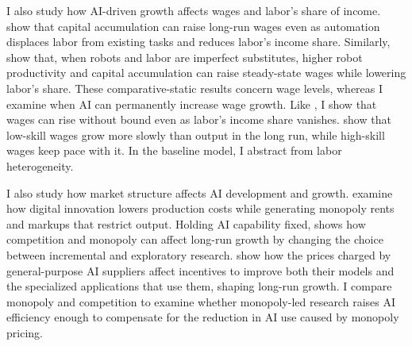 I also study how AI-driven growth affects wages and labor's share of income.
\citet{acemoglurestrepo2018} show that capital accumulation can raise
long-run wages even as automation displaces labor from existing tasks
and reduces labor's income share. Similarly, \citet{bergbuffiezanna2018}
show that, when robots and labor are imperfect substitutes, higher robot
productivity and capital accumulation can raise steady-state wages while
lowering labor's share. These comparative-static results concern wage
levels, whereas I examine when AI can permanently increase wage growth.
Like \citet{raymookherjee2022}, I show that wages can rise without bound
even as labor's income share vanishes. \citet{hemousolsen2022} show that
low-skill wages grow more slowly than output in the long run, while
high-skill wages keep pace with it. In the baseline model, I abstract from
labor heterogeneity.

I also study how market structure affects AI development and growth.
\citet{korinekng2019} examine how digital innovation lowers production
costs while generating monopoly rents and markups that restrict output.
Holding AI capability fixed, \citet{gans2025aiknowledge} shows how
competition and monopoly can affect long-run growth by changing the
choice between incremental and exploratory research.
\citet{liuwan2026} show how the prices charged by general-purpose AI
suppliers affect incentives to improve both their models and the
specialized applications that use them, shaping long-run growth.
I compare monopoly and competition to examine whether monopoly-led
research raises AI efficiency enough to compensate for the reduction
in AI use caused by monopoly pricing.


